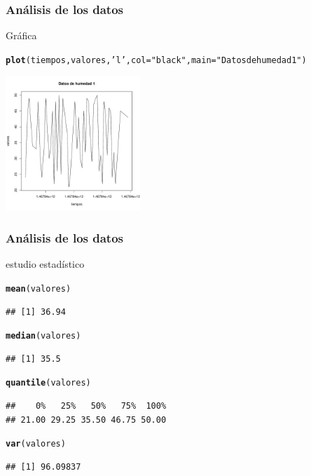 \documentclass[10pt]{beamer}\usepackage[]{graphicx}\usepackage[]{color}
\makeatletter
\newcommand{\hlstr}[1]{\textcolor[rgb]{0.192,0.494,0.8}{#1}}%
\newcommand{\hlstd}[1]{\textcolor[rgb]{0.345,0.345,0.345}{#1}}%
\newcommand{\hlkwc}[1]{\textcolor[rgb]{0.333,0.667,0.333}{#1}}%
\newcommand{\hlkwd}[1]{\textcolor[rgb]{0.737,0.353,0.396}{\textbf{#1}}}%
\newenvironment{kframe}{%
 \def\at@end@of@kframe{}%
 \ifinner\ifhmode%
  \def\at@end@of@kframe{\end{minipage}}%
  \begin{minipage}{\columnwidth}%
 \fi\fi%
 \def\FrameCommand##1{\hskip\@totalleftmargin \hskip-\fboxsep
 \colorbox{shadecolor}{##1}\hskip-\fboxsep
     \hskip-\linewidth \hskip-\@totalleftmargin \hskip\columnwidth}%
 \MakeFramed {\advance\hsize-\width
   \@totalleftmargin\z@ \linewidth\hsize
   \@setminipage}}%
 {\par\unskip\endMakeFramed%
 \at@end@of@kframe}
\newenvironment{knitrout}{}{} %
\makeatother
\begin{document}
\begin{frame}[fragile]
	\frametitle{Análisis de los datos}
	Gráfica
	\begin{center}
\begin{knitrout}
\color{fgcolor}\begin{kframe}
\begin{alltt}
\hlkwd{plot}\hlstd{(tiempos,valores,}\hlstr{'l'}\hlstd{,}\hlkwc{col} \hlstd{=} \hlstr{"black"}\hlstd{,}\hlkwc{main} \hlstd{=} \hlstr{"Datos de humedad 1"}\hlstd{)}
\end{alltt}
\end{kframe}
\includegraphics[width=2in]{figure/unnamed-chunk-4-1} 

\end{knitrout}
	 	
	\end{center}	
\end{frame}

\begin{frame}[fragile]
	\frametitle{Análisis de los datos}
	 estudio estadístico
\begin{knitrout}
\color{fgcolor}\begin{kframe}
\begin{alltt}
\hlkwd{mean}\hlstd{(valores)}
\end{alltt}
\begin{verbatim}
## [1] 36.94
\end{verbatim}
\begin{alltt}
\hlkwd{median}\hlstd{(valores)}
\end{alltt}
\begin{verbatim}
## [1] 35.5
\end{verbatim}
\begin{alltt}
\hlkwd{quantile}\hlstd{(valores)}
\end{alltt}
\begin{verbatim}
##    0%   25%   50%   75%  100% 
## 21.00 29.25 35.50 46.75 50.00
\end{verbatim}
\begin{alltt}
\hlkwd{var}\hlstd{(valores)}
\end{alltt}
\begin{verbatim}
## [1] 96.09837
\end{verbatim}
\end{kframe}
\end{knitrout}
\end{frame}
\end{document}

